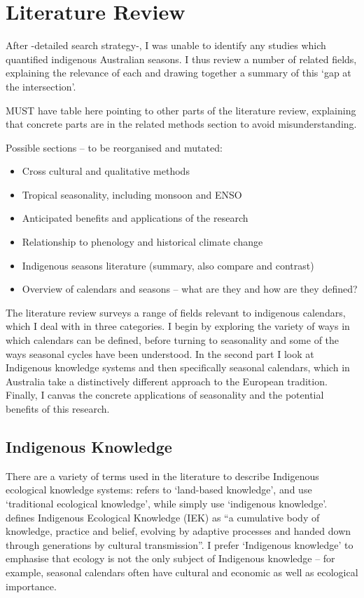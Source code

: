\section{Literature Review}
\label{sec:lit-review}

After -detailed search strategy-, I was unable to identify any studies which 
quantified indigenous Australian seasons.
I thus review a number of related fields, explaining the relevance of each and 
drawing together a summary of this `gap at the intersection'.

MUST have table here pointing to other parts of the literature review, 
explaining that concrete parts are in the related methods section to avoid 
misunderstanding. 

Possible sections – to be reorganised and mutated:
\begin{itemize}
\item Cross cultural and qualitative methods
\item Tropical seasonality, including monsoon and ENSO
\item Anticipated benefits and applications of the research
\item Relationship to phenology and historical climate change
\item Indigenous seasons literature (summary, also compare and contrast)
\item Overview of calendars and seasons – what are they and how are they defined?
\end{itemize}



The literature review surveys a range of fields relevant to indigenous 
calendars, which I deal with in three categories.  I begin by exploring the 
variety of ways in which calendars can be defined, before turning to 
seasonality and some of the ways seasonal cycles have been understood.  In the 
second part I look at Indigenous knowledge systems and then specifically 
seasonal calendars, which in Australia take a distinctively different approach 
to the European tradition.  Finally, I canvas the concrete applications of 
seasonality and the potential benefits of this research.



\subsection{Indigenous Knowledge}

There are a variety of terms used in the literature to describe Indigenous 
ecological knowledge systems:  \citet{clarke2009} refers to `land-based knowledge', 
\citet{petheram2010} and \citet{turner2009} use `traditional ecological 
knowledge', while \citet{cochran2015} simply use `indigenous knowledge'.  
\citet{berkes2012} defines Indigenous Ecological Knowledge (IEK) as ``a cumulative 
body of knowledge, practice and belief, evolving by adaptive processes and 
handed down through generations by cultural transmission''.  I prefer 
`Indigenous knowledge' to emphasise that ecology is not the only subject of 
Indigenous knowledge – for example, seasonal calendars often have cultural and 
economic as well as ecological importance.

